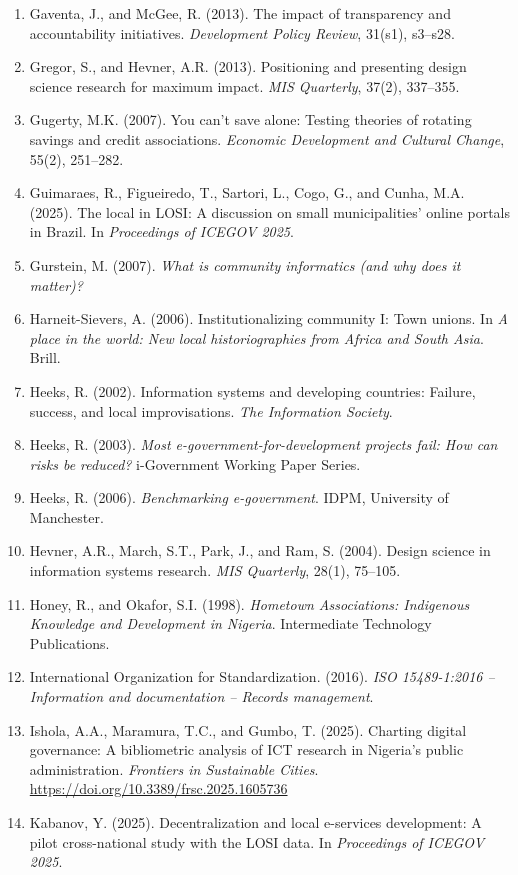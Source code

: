 \documentclass[sigconf,anonymous]{acmart}
\begin{document}
{\begin{enumerate}
\item Gaventa, J., and McGee, R. (2013). The impact of transparency and accountability initiatives. \textit{Development Policy Review}, 31(s1), s3--s28.
\item Gregor, S., and Hevner, A.R. (2013). Positioning and presenting design science research for maximum impact. \textit{MIS Quarterly}, 37(2), 337--355.
\item Gugerty, M.K. (2007). You can't save alone: Testing theories of rotating savings and credit associations. \textit{Economic Development and Cultural Change}, 55(2), 251--282.
\item Guimaraes, R., Figueiredo, T., Sartori, L., Cogo, G., and Cunha, M.A. (2025). The local in LOSI: A discussion on small municipalities' online portals in Brazil. In \textit{Proceedings of ICEGOV 2025}.
\item Gurstein, M. (2007). \textit{What is community informatics (and why does it matter)?}
\item Harneit-Sievers, A. (2006). Institutionalizing community I: Town unions. In \textit{A place in the world: New local historiographies from Africa and South Asia}. Brill.
\item Heeks, R. (2002). Information systems and developing countries: Failure, success, and local improvisations. \textit{The Information Society}.
\item Heeks, R. (2003). \textit{Most e-government-for-development projects fail: How can risks be reduced?} i-Government Working Paper Series.
\item Heeks, R. (2006). \textit{Benchmarking e-government}. IDPM, University of Manchester.
\item Hevner, A.R., March, S.T., Park, J., and Ram, S. (2004). Design science in information systems research. \textit{MIS Quarterly}, 28(1), 75--105.
\item Honey, R., and Okafor, S.I. (1998). \textit{Hometown Associations: Indigenous Knowledge and Development in Nigeria}. Intermediate Technology Publications.
\item International Organization for Standardization. (2016). \textit{ISO 15489-1:2016 -- Information and documentation -- Records management}.
\item Ishola, A.A., Maramura, T.C., and Gumbo, T. (2025). Charting digital governance: A bibliometric analysis of ICT research in Nigeria's public administration. \textit{Frontiers in Sustainable Cities}. \url{https://doi.org/10.3389/frsc.2025.1605736}
\item Kabanov, Y. (2025). Decentralization and local e-services development: A pilot cross-national study with the LOSI data. In \textit{Proceedings of ICEGOV 2025}.

\end{enumerate}}
\end{document}
